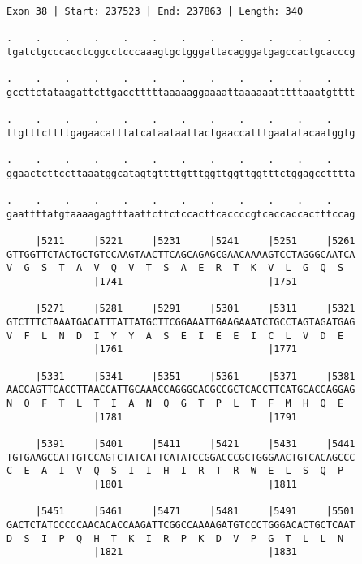 \documentclass{article}
\begin{document}
\begin{Verbatim}[fontfamily=courier]
Exon 38 | Start: 237523 | End: 237863 | Length: 340

.    .    .    .    .    .    .    .    .    .    .    .    
tgatctgcccacctcggcctcccaaagtgctgggattacagggatgagccactgcacccg

.    .    .    .    .    .    .    .    .    .    .    .    
gccttctataagattcttgacctttttaaaaaggaaaattaaaaaatttttaaatgtttt

.    .    .    .    .    .    .    .    .    .    .    .    
ttgtttcttttgagaacatttatcataataattactgaaccatttgaatatacaatggtg

.    .    .    .    .    .    .    .    .    .    .    .    
ggaactcttccttaaatggcatagtgttttgtttggttggttggtttctggagcctttta

.    .    .    .    .    .    .    .    .    .    .    .    
gaattttatgtaaaagagtttaattcttctccacttcaccccgtcaccaccactttccag

     |5211     |5221     |5231     |5241     |5251     |5261
GTTGGTTCTACTGCTGTCCAAGTAACTTCAGCAGAGCGAACAAAAGTCCTAGGGCAATCA
V  G  S  T  A  V  Q  V  T  S  A  E  R  T  K  V  L  G  Q  S  
               |1741                         |1751          

     |5271     |5281     |5291     |5301     |5311     |5321
GTCTTTCTAAATGACATTTATTATGCTTCGGAAATTGAAGAAATCTGCCTAGTAGATGAG
V  F  L  N  D  I  Y  Y  A  S  E  I  E  E  I  C  L  V  D  E  
               |1761                         |1771          

     |5331     |5341     |5351     |5361     |5371     |5381
AACCAGTTCACCTTAACCATTGCAAACCAGGGCACGCCGCTCACCTTCATGCACCAGGAG
N  Q  F  T  L  T  I  A  N  Q  G  T  P  L  T  F  M  H  Q  E  
               |1781                         |1791          

     |5391     |5401     |5411     |5421     |5431     |5441
TGTGAAGCCATTGTCCAGTCTATCATTCATATCCGGACCCGCTGGGAACTGTCACAGCCC
C  E  A  I  V  Q  S  I  I  H  I  R  T  R  W  E  L  S  Q  P  
               |1801                         |1811          

     |5451     |5461     |5471     |5481     |5491     |5501
GACTCTATCCCCCAACACACCAAGATTCGGCCAAAAGATGTCCCTGGGACACTGCTCAAT
D  S  I  P  Q  H  T  K  I  R  P  K  D  V  P  G  T  L  L  N  
               |1821                         |1831          

\end{Verbatim}
\newpage
\end{document}
